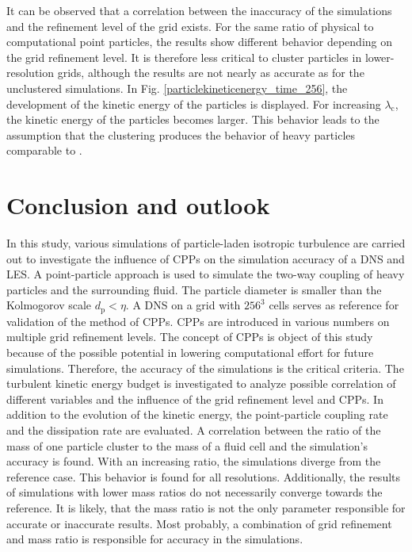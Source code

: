 \documentclass[11pt,a4paper,openany,oneside,parskip=half*]{article}
\begin{document}
It can be observed that a correlation between the inaccuracy of the simulations and the refinement level of the grid exists. For the same ratio of physical to computational point particles, the results show different behavior depending on the grid refinement level. It is therefore less critical to cluster particles in lower-resolution grids, although the results are not nearly as accurate as for the unclustered simulations. 
\newline %
In Fig. \ref{particlekineticenergy_time_256}, the development of the kinetic energy of the particles is displayed. For increasing $\lambda_\mathrm{c}$, the kinetic energy of the particles becomes larger. This behavior leads to the assumption that the clustering produces the behavior of heavy particles comparable to \cite{Schneiders2017}. 
\pagebreak
\section{Conclusion and outlook}
In this study, various simulations of particle-laden isotropic turbulence are carried out to investigate the influence of CPPs on the simulation accuracy of a DNS and LES. A point-particle approach is used to simulate the two-way coupling of heavy particles and the surrounding fluid. The particle diameter is smaller than the Kolmogorov scale $d_\mathrm{p} < \eta$. A DNS on a grid with $256^3$ cells serves as reference for validation of the method of CPPs. CPPs are introduced in various numbers on multiple grid refinement levels. The concept of CPPs is object of this study because of the possible potential in lowering computational effort for future simulations. Therefore, the accuracy of the simulations is the critical criteria. The turbulent kinetic energy budget is investigated to analyze possible correlation of different variables and the influence of the grid refinement level and CPPs. In addition to the evolution of the kinetic energy, the point-particle coupling rate and the dissipation rate are evaluated.
\newline
A correlation between the ratio of the mass of one particle cluster to the mass of a fluid cell and the simulation's accuracy is found. With an increasing ratio, the simulations diverge from the reference case. This behavior is found for all resolutions. Additionally, the results of simulations with lower mass ratios do not necessarily converge towards the reference. It is likely, that the mass ratio is not the only parameter responsible for accurate or inaccurate results. Most probably, a combination of grid refinement and mass ratio is responsible for accuracy in the simulations.
\end{document}
